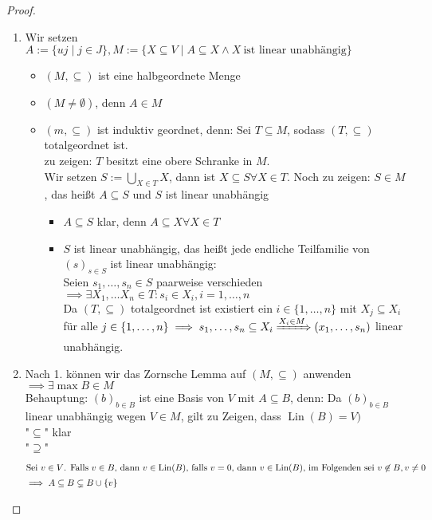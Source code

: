 \documentclass[a4paper]{scrartcl}
\DeclareMathOperator{\Exists}{\exists}
\DeclareMathOperator{\Forall}{\forall}
\DeclareMathOperator{\Lin}{Lin}
\theoremstyle{definition}
\theoremstyle{plain}
\theoremstyle{plain}
\theoremstyle{remark}
\theoremstyle{remark}
\theoremstyle{remark}
\theoremstyle{remark}
\theoremstyle{remark}
\begin{document}
\begin{proof}
\begin{enumerate}
\item Wir setzen $A:= \{uj \mid j \in J\}, M:= \{X \subseteq V \mid A\subseteq X \wedge X ~\text{ist linear unabhängig}\}$
\begin{itemize}
\item $(M, \subseteq)$ ist eine halbgeordnete Menge
\item $(M \neq \emptyset)$, denn $A\in M$
\item $(m, \subseteq)$ ist induktiv geordnet, denn:
Sei $T\subseteq M$, sodass $(T,\subseteq)$ totalgeordnet ist. \\
           zu zeigen: $T$ besitzt eine obere Schranke in $M$. \\
           Wir setzen $\displaystyle S:= \bigcup_{X\in T} X$, dann ist $X\subseteq S \Forall X\in T$.
Noch zu zeigen: $S\in M$, das heißt $A\subseteq S$ und $S$ ist linear unabhängig
\begin{itemize}
\item $A\subseteq S$ klar, denn $A\subseteq X\Forall X\in T$
\item $S$ ist linear unabhängig, das heißt jede endliche Teilfamilie von $(s)_{s\in S}$ ist linear unabhängig: \\
                 Seien $s_1, \ldots, s_n \in S$ paarweise verschieden $\implies \Exists X_1, \ldots X_n \in T: s_i \in X_i, i = 1, \ldots, n$ \\
                 Da $(T, \subseteq)$ totalgeordnet ist existiert ein $i\in \{1, \ldots, n\}$ mit $X_j \subseteq X_i$ für alle $j\in \{1,\ldots,n\} \implies s_1, \ldots, s_n \subseteq X_i \xRightarrow{X_i \in M} (x_1, \ldots, s_n)$ linear unabhängig.
\end{itemize}
\end{itemize}
\item Nach 1. können wir das Zornsche Lemma auf $(M,\subseteq)$ anwenden $\implies \Exists \max B \in M$ \\
         Behauptung: $(b)_{b\in B}$ ist eine Basis von $V$ mit $A\subseteq B$, denn: Da $(b)_{b\in B}$ linear unabhängig wegen $V\in M$, gilt zu Zeigen, dass $\Lin(B) = V)$ \\
         "$\subseteq$" klar \\
         "$\supseteq$"
\begin{align*}
\intertext{Sei $v \in V$. Falls $v\in B$, dann $v\in\Lin(B)$, falls $v = 0$, dann $v\in \Lin(B)$, im Folgenden sei $v\not\in B, v\neq 0$}
\implies A \subseteq B \subsetneq B\cup \{v\} \\

\end{align*}
\end{enumerate}
\end{proof}
\end{document}
